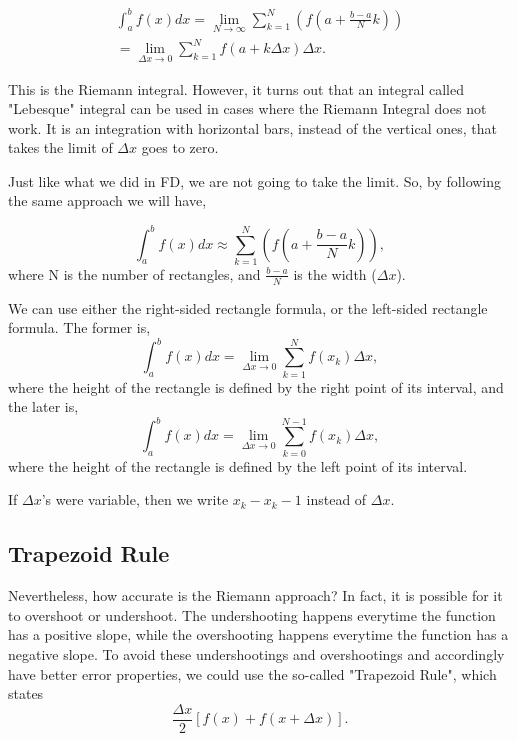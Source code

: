\documentclass[11pt]{article}
\theoremstyle{definition}
\begin{document}
\begin{equation}
\begin{flalign*}
     \int_{a}^{b} f(x)dx = \lim_{N \to \infty } \sum_{k=1}^{N}(f(a+\frac{b-a}{N}k)) \\
    = \lim_{\Delta x \to 0 }\sum_{k=1}^{N} f(a + k\Delta x)\Delta x.
\end{flalign*}
\end{equation}

This is the Riemann integral. However, it turns out that an integral called "Lebesque" integral can be used in cases where the Riemann Integral does not work. It is an integration with horizontal bars, instead of the vertical ones, that takes the limit of $\Delta x$ goes to zero. 

Just like what we did in FD, we are not going to take the limit. So, by following the same approach we will have, 

\begin{equation}
  \int_{a}^{b} f(x)dx \approx \sum_{k=1}^{N}(f(a+\frac{b-a}{N}k)),
\end{equation}
where N is the number of rectangles, and $\frac{b-a}{N}$ is the width ($\Delta x$).

We can use either the right-sided rectangle formula, or the left-sided rectangle formula. The former is, 
\begin{equation}
 \int_{a}^{b} f(x)dx = \lim_{\Delta x \to 0 }\sum_{k=1}^{N} f(x_k)\Delta x,
\end{equation}
 where the height of the rectangle is defined by the right point of its interval, and the later is, 
 \begin{equation}
  \int_{a}^{b} f(x)dx = \lim_{\Delta x \to 0 }\sum_{k=0}^{N-1} f(x_k)\Delta x,
 \end{equation}
 where the height of the rectangle is defined by the left point of its interval. 
 
 If $\Delta x$'s were variable, then we write $x_k - x_k-1$ instead of $\Delta x$.
 
 \subsection{Trapezoid Rule}
 
 Nevertheless, how accurate is the Riemann approach? In fact, it is possible for it to overshoot or undershoot. The undershooting happens everytime the function has a positive slope, while the overshooting happens everytime the function has a negative slope. To avoid these undershootings and overshootings and accordingly have better error properties, we could use the so-called "Trapezoid Rule", which states
 \begin{equation}
  \frac{\Delta x}{2}[f(x)+f(x+\Delta x)].
 \end{equation}
\end{document}

